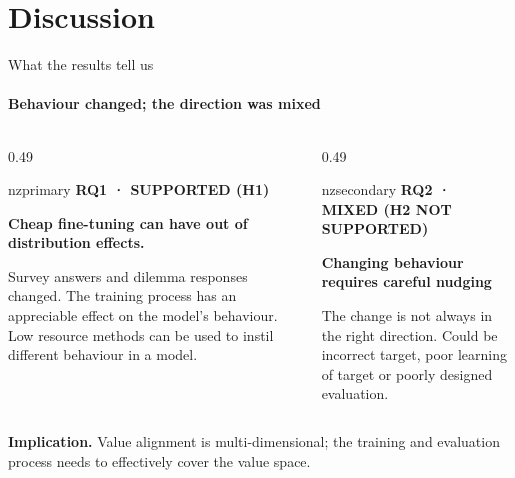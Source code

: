 \documentclass[aspectratio=169,11pt,t]{beamer}
\newcommand{\nzlabel}[1]{%
  {\sffamily\bfseries\fontsize{7}{8}\selectfont
   \color{nzsecondary}\MakeUppercase{#1}}}
\begin{document}
\section{Discussion}

\begin{frame}{What the results tell us}
  \framesubtitle{Behaviour changed; the direction was mixed}
  \vspace{-5mm}
  \begin{columns}[T,onlytextwidth]
    \begin{column}{0.49\textwidth}
      \begin{nzcard}[left=3mm,right=3mm,top=2mm,bottom=2mm]{nzprimary}
        \nzlabel{RQ1 · supported (H1)}\par\vspace{0.8mm}
        {\bfseries\fontsize{12}{14}\selectfont Cheap fine-tuning can have out of distribution effects.}\par
        \vspace{1mm}
        {\fontsize{8.5}{10.2}\selectfont\color{nztext}Survey answers and
         dilemma responses changed. The training process has an appreciable effect on the model's behaviour. Low resource methods can be used to instil different behaviour in a model.}
      \end{nzcard}
    \end{column}
    \hfill
    \pause
    \begin{column}{0.49\textwidth}
      \begin{nzcard}[left=3mm,right=3mm,top=2mm,bottom=2mm]{nzsecondary}
        \nzlabel{RQ2 · mixed (H2 not supported)}\par\vspace{0.8mm}
        {\bfseries\fontsize{12}{14}\selectfont Changing behaviour requires careful nudging}\par
        \vspace{1mm}
        {\fontsize{8.5}{10.2}\selectfont\color{nztext}The change is not always in the right direction. Could be incorrect target, poor learning of target or poorly designed evaluation.}
      \end{nzcard}
    \end{column}
  \end{columns}
  \vspace{1mm}
  {\fontsize{9}{11}\selectfont
   \textbf{\color{nzsecondary}Implication.} Value alignment is
   multi-dimensional; the training and evaluation process needs to effectively cover the value space.}
\end{frame}
\end{document}

